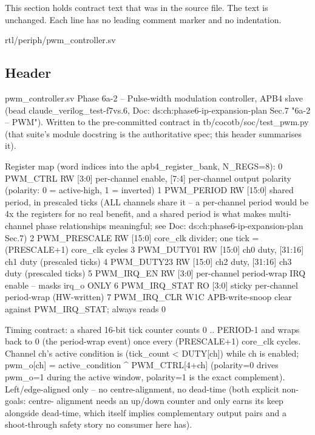 This section holds contract text that was in the source file. The text is unchanged. Each line has no leading comment marker and no indentation.

\begin{relocated}{rtl/periph/pwm_controller.sv}

\subsection*{Header}

\begin{textblock}
pwm_controller.sv
Phase 6a-2 -- Pulse-width modulation controller, APB4 slave (bead claude_verilog_test-f7vs.6,
Doc: ds:ch:phase6-ip-expansion-plan Sec.7 "6a-2 -- PWM"). Written to the pre-committed contract in
tb/cocotb/soc/test_pwm.py (that suite's module docstring is the authoritative spec; this header
summarises it).

Register map (word indices into the apb4_register_bank, N_REGS=8):
  0  PWM_CTRL       RW   [3:0] per-channel enable, [7:4] per-channel output polarity
                          (polarity: 0 = active-high, 1 = inverted)
  1  PWM_PERIOD     RW   [15:0] shared period, in prescaled ticks (ALL channels share it --
                          a per-channel period would be 4x the registers for no real benefit,
                          and a shared period is what makes multi-channel phase relationships
                          meaningful; see Doc: ds:ch:phase6-ip-expansion-plan Sec.7)
  2  PWM_PRESCALE   RW   [15:0] core_clk divider; one tick = (PRESCALE+1) core_clk cycles
  3  PWM_DUTY01     RW   [15:0] ch0 duty, [31:16] ch1 duty (prescaled ticks)
  4  PWM_DUTY23     RW   [15:0] ch2 duty, [31:16] ch3 duty (prescaled ticks)
  5  PWM_IRQ_EN     RW   [3:0] per-channel period-wrap IRQ enable -- masks irq_o ONLY
  6  PWM_IRQ_STAT   RO   [3:0] sticky per-channel period-wrap (HW-written)
  7  PWM_IRQ_CLR    W1C  APB-write-snoop clear against PWM_IRQ_STAT; always reads 0

Timing contract: a shared 16-bit tick counter counts 0 .. PERIOD-1 and wraps back to 0 (the
period-wrap event) once every (PRESCALE+1) core_clk cycles. Channel ch's active condition is
(tick_count < DUTY[ch]) while ch is enabled; pwm_o[ch] = active_condition ^ PWM_CTRL[4+ch]
(polarity=0 drives pwm_o=1 during the active window, polarity=1 is the exact complement).
Left/edge-aligned only -- no centre-alignment, no dead-time (both explicit non-goals: centre-
alignment needs an up/down counter and only earns its keep alongside dead-time, which itself
implies complementary output pairs and a shoot-through safety story no consumer here has).


\end{textblock}
\end{relocated}
